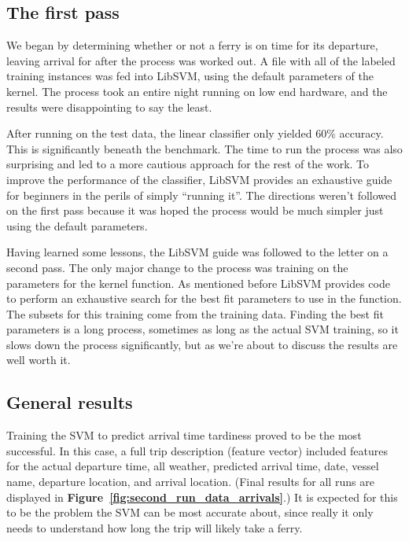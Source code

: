 \documentclass[11pt]{article} %
\begin{document}
\subsection{The first pass}
\label{sec:firstpass}
We began by determining whether or not a ferry is on
time for its departure, leaving arrival for after the process was worked out. 
A file with all of the labeled training instances was fed into LibSVM, using the
default parameters of the kernel. The process took an entire night running on
low end hardware, and the results were disappointing to say the least.

After running on the test data, the linear classifier only yielded $60\%$ accuracy. 
This is significantly beneath the benchmark. The time to run the process was also
surprising and led to a more cautious approach for the rest of the work. To 
improve the performance of the classifier, LibSVM provides an exhaustive guide 
\cite{chang2011libsvm} for beginners in the perils of simply ``running it''. The 
directions weren't followed on the first pass because it was hoped the process 
would be much simpler just using the default parameters. 

Having learned some lessons, the LibSVM guide was followed to the letter on a 
second pass. The only major change to the process was training on the 
parameters for the kernel function. As mentioned before LibSVM provides code
to perform an exhaustive search for the best fit parameters to use in the function.
The subsets for this training come from the training data. Finding the best fit 
parameters is a long process, sometimes as long as the actual SVM training, so it
slows down the process significantly, but as we're about to discuss the results
are well worth it.
% 

\subsection{General results}
\label{sec:gen_results}
Training the SVM to predict arrival time tardiness proved to be the most successful.
In this case, a full trip description (feature vector) included features for the 
actual departure 
time, all weather, predicted arrival time, date, vessel name, departure location, 
and arrival location. (Final results for all runs are displayed in 
\textbf{Figure~\ref{fig:second_run_data_arrivals}}.) It is expected for this to 
be the problem the SVM can be most accurate about, since really it only needs to 
understand how long the trip will likely take a ferry. 
\end{document}
